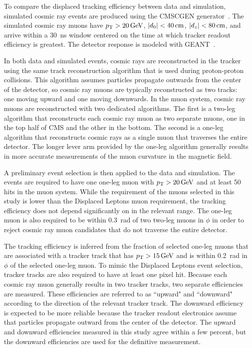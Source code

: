 To compare the displaced tracking efficiency between data and simulation, simulated cosmic ray events are produced using the CMSCGEN generator~\cite{cmscgen}. The simulated cosmic ray muons have $\pt>\SI{20}{\GeV}$, $\ad<\SI{40}{\cm}$, $\abs{d_z}<\SI{80}{\cm}$, and arrive within a \SI{30}{\ns} window centered on the time at which tracker readout efficiency is greatest. The detector response is modeled with GEANT~\cite{geant4}.

In both data and simulated events, cosmic rays are reconstructed in the tracker using the same track reconstruction algorithm that is used during proton-proton collisions. This algorithm assumes particles propagate outwards from the center of the detector, so cosmic ray muons are typically reconstructed as two tracks: one moving upward and one moving downwards. In the muon system, cosmic ray muons are reconstructed with two dedicated algorithms. The first is a two-leg algorithm that reconstructs each cosmic ray muon as two separate muons, one in the top half of CMS and the other in the bottom. The second is a one-leg algorithm that reconstructs cosmic rays as a single muon that traverses the entire detector. The longer lever arm provided by the one-leg algorithm generally results in more accurate measurements of the muon curvature in the magnetic field.

A preliminary event selection is then applied to the data and simulation. The events are required to have one one-leg muon with $\pt>\SI{20}{\GeV}$ and at least \num{50} hits in the muon system. While the \pt requirement of the muons selected in this study is lower than the Displaced Leptons muon \pt requirement, the tracking efficiency does not depend significantly on \pt in the relevant range. The one-leg muon is also required to be within \SI{0.3}{\radian} of two two-leg muons in $\phi$ in order to reject cosmic ray muon candidates that do not traverse the entire detector.

The tracking efficiency is inferred from the fraction of selected one-leg muons that are associated with a tracker track that has $\pt>\SI{15}{\GeV}$ and is within \SI{0.2}{\radian} in $\phi$ of the selected one-leg muon. To mimic the Displaced Leptons event selection, tracker tracks are also required to have at least one pixel hit. Because each cosmic ray muon generally results in two tracker tracks, two separate efficiencies are measured. These efficiencies are referred to as ``upward" and ``downward" according to the direction of the relevant tracker track. The downward efficiency is expected to be more reliable because the tracker readout electronics assume that particles propagate outward from the center of the detector. The upward and downward efficiencies measured in this study agree within a few percent, but the downward efficiencies are used for the definitive measurement.

